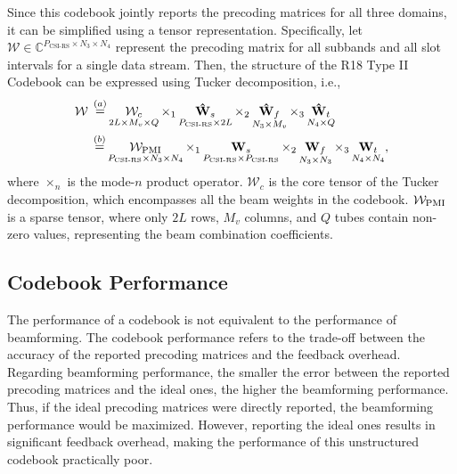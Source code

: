 \documentclass[lettersize,journal]{IEEEtran}
\begin{document}
Since this codebook jointly reports the precoding matrices for all three domains, it can be simplified using a tensor representation. Specifically, let \(\mathcal{W} \in \mathbb{C}^{P_{\text{CSI-RS}} \times N_3 \times N_4}\) represent the precoding matrix for all subbands and all slot intervals for a single data stream. Then, the structure of the R18 Type II Codebook can be expressed using Tucker decomposition, i.e., 
\begin{align}\label{tucker}
\mathcal{W}\; &\mathop  = \limits^{(a)} \mathop {{{\mathcal{W}}_c}}\limits_{2L \times {M_v} \times Q} { \times _1}\mathop {{{{\bf{\hat W}}}_s}}\limits_{{P_{{\text{CSI-RS}}}} \times 2L} { \times _2}\mathop {{{{\bf{\hat W}}}_f}}\limits_{{N_3} \times {M_v}} { \times _3}\mathop {{{{\bf{\hat W}}}_t}}\limits_{{N_4} \times Q} \\
&\mathop  = \limits^{(b)} \mathop {{{\mathcal{W}}_{\rm{PMI}}}}\limits_{{P_{{\text{CSI-RS}}}} \times {N_3} \times {N_4}} { \times _1}\mathop {{{\bf{W}}_s}}\limits_{{P_{{\text{CSI-RS}}}} \times {P_{{\text{CSI-RS}}}}} { \times _2}\mathop {{{\bf{W}}_f}}\limits_{{N_3} \times {N_3}} { \times _3}\mathop {{{\bf{W}}_t}}\limits_{{N_4} \times {N_4}},\notag 
\end{align}
where $\times _n$ is the mode-$n$ product operator.  \(\mathcal{W}_{c}\) is the core tensor of the Tucker decomposition, which encompasses all the beam weights in the codebook. \(\mathcal{W}_{\rm{PMI}}\) is a sparse tensor, where only \(2L\) rows, \(M_v\) columns, and \(Q\) tubes contain non-zero values, representing the beam combination coefficients.


\subsection{Codebook Performance}
The performance of a codebook is not equivalent to the performance of beamforming. The codebook performance refers to the trade-off between the accuracy of the reported precoding matrices and the feedback overhead. Regarding beamforming performance, the smaller the error between the reported precoding matrices and the ideal ones, the higher the beamforming performance. Thus, if the ideal precoding matrices were directly reported, the beamforming performance would be maximized. However, reporting the ideal ones results in significant feedback overhead, making the performance of this unstructured codebook practically poor.
\end{document}

